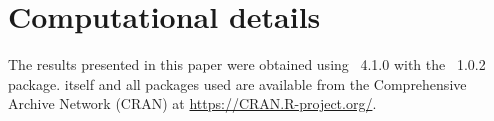 \documentclass[article,shortnames]{jss}
\begin{document}
\section*{Computational details}

The results presented in this paper were obtained using
~4.1.0 with the
~1.0.2 package.  itself
and all packages used are available from the Comprehensive
 Archive Network (CRAN) at \url{https://CRAN.R-project.org/}.







% 
% 
% 
% 
% 
\end{document}
